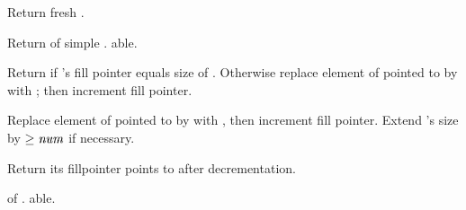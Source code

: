 \begin{LIST}{1cm}
  
  {
  Return fresh .
  }

  {
  Return  of simple . able.
  }

  {
  Return \retval{\NIL} if 's fill pointer equals size of
  . Otherwise replace element of  pointed to
  by  with ; then increment fill
  pointer. 
  }

  {
  Replace element of  pointed to by  with
  , then increment fill pointer. Extend 's size by
  $\ge \VAR{num}$ if necessary.
  }

  {
  Return  its fillpointer points to
  after decrementation.
  }

  {
   of . able.
  }

\end{LIST}




